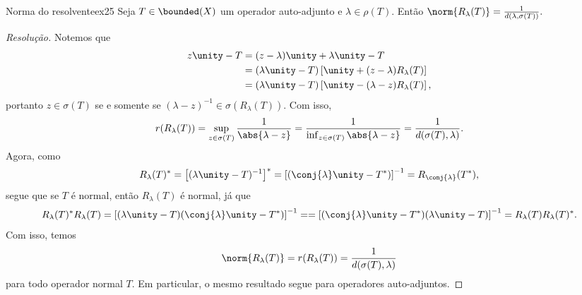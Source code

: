 \begin{exercício}{Norma do resolvente}{ex25}
  Seja \(T \in \bounded(X)\) um operador auto-adjunto e \(\lambda \in \rho(T).\) Então \(\norm{R_\lambda(T)} = \frac{1}{d(\lambda, \sigma(T))}.\)
\end{exercício}
\begin{proof}[Resolução]
  Notemos que
  \begin{align*}
    z \unity - T &= (z - \lambda)\unity + \lambda \unity - T\\
                 &= (\lambda\unity - T)\left[\unity + (z - \lambda)R_\lambda(T)\right]\\
                 &= (\lambda \unity - T)\left[\unity - (\lambda - z)R_\lambda(T)\right],
  \end{align*}
  portanto \(z \in \sigma(T)\) se e somente se \((\lambda - z)^{-1} \in \sigma(R_{\lambda}(T)).\) Com isso,
  \begin{equation*}
    r(R_{\lambda}(T)) = \sup_{z \in \sigma(T)}{\frac{1}{\abs{\lambda - z}}} = \frac{1}{\inf_{z \in \sigma(T)}{\abs{\lambda - z}}} = \frac{1}{d(\sigma(T),\lambda)}.
  \end{equation*}
  Agora, como
  \begin{equation*}
    R_\lambda(T)^* = \left[(\lambda \unity - T)^{-1}\right]^* = \left[(\conj{\lambda} \unity - T^*)\right]^{-1} = R_{\conj{\lambda}}(T^*),
  \end{equation*}
  segue que se \(T\) é normal, então \(R_\lambda(T)\) é normal, já que
  \begin{equation*}
    R_\lambda(T)^*R_\lambda(T) = \left[(\lambda\unity - T)(\conj{\lambda}\unity - T^*)\right]^{-1} = = \left[(\conj{\lambda}\unity - T^*)(\lambda\unity - T)\right]^{-1} = R_{\lambda}(T)R_\lambda(T)^*.
  \end{equation*}
  Com isso, temos
  \begin{equation*}
    \norm{R_\lambda(T)} = r(R_\lambda(T)) = \frac{1}{d(\sigma(T), \lambda)}
  \end{equation*}
  para todo operador normal \(T.\) Em particular, o mesmo resultado segue para operadores auto-adjuntos.
\end{proof}
